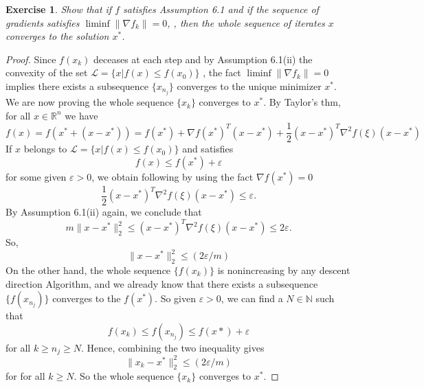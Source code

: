 \documentclass[11pt,a4paper]{article}
\renewcommand{\(}{\left(}
\renewcommand{\)}{\right)}
\newtheorem{exercise}{Exercise}
\begin{document}
  \setcounter{exercise}{11}
  \begin{exercise}
  	Show that if $f$ satisfies Assumption 6.1 and if the sequence of gradients satisfies $\liminf \|\nabla f_k\| = 0$, , then the whole sequence of iterates $x$ converges to the solution $x^*$.
  \end{exercise}
  \begin{proof}
  	Since $f(x_k)$ deceases at each step and by Assumption 6.1(ii) the convexity of the set $\mathcal{L} = \{x|f(x)\le f(x_0)\}$ , the fact $\liminf \|\nabla f_k\| = 0$ implies there exists a subsequence $\{x_{n_j}\}$ converges to the unique minimizer $x^*$. We are now proving the whole sequence $\{x_k\}$ converges to $x^*$.
  	By Taylor's thm, for all $x \in \mathbb{R}^n$ we have
  	$$
  	f(x) = f(x^*+(x-x^*)) = f(x^*) + \nabla f(x^*)^T(x-x^*) + \frac{1}{2}(x-x^*)^T\nabla^2 f(\xi)(x-x^*)
  	$$
  	If $x$ belongs to $\mathcal{L} = \{x|f(x)\le f(x_0)\}$ and satisfies $$f(x) \le f(x^*) + \varepsilon$$ for some given $\varepsilon > 0$, we obtain following by using the fact $\nabla f(x^*) = 0$
  	$$  	
  	\frac{1}{2}(x-x^*)^T\nabla^2 f(\xi)(x-x^*) \le \varepsilon.
  	$$
  	By Assumption 6.1(ii) again, we conclude that
  	$$
  	m\|x-x^*\|_2^2 \le (x-x^*)^T\nabla^2 f(\xi)(x-x^*) \le 2\varepsilon.
  	$$
  	So, 
  	$$
  	\|x-x^*\|_2^2 \le (2\varepsilon/m)
  	$$
  	On the other hand, the whole sequence $\{f(x_k)\}$ is nonincreasing by any descent direction Algorithm, and we already know that there exists a subsequence $\{f(x_{n_j})\}$ converges to the $f(x^*)$. 
  	So given $\varepsilon > 0$, we can find a $N \in \mathbb{N}$ such that
  	$$
  	f(x_k) \le f(x_{n_j}) \le f(x*) + \varepsilon
  	$$
  	for all $k \ge n_j \ge N.$
  	Hence, combining the two inequality gives
  	$$
  	\|x_k-x^*\|_2^2  \le (2\varepsilon/m)
  	$$
  	for for all $k \ge N.$
  	So the whole sequence $\{x_k\}$ converges to $x^*$.
  \end{proof}
  
\end{document}
